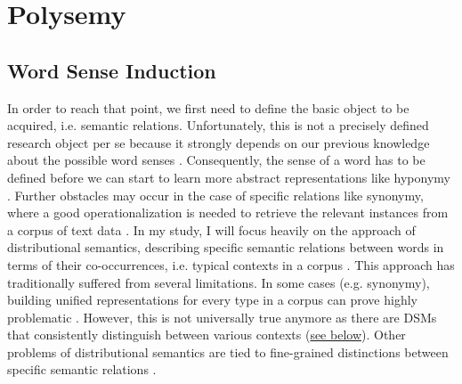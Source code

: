 \chapter{Polysemy}
\section{Word Sense Induction}
\label{polysemyProblemForSemanticRelations}
In order to reach that point, we first need to define the basic object to be acquired, i.e. semantic relations. Unfortunately, this is not a precisely defined research object per se because it strongly depends on our previous knowledge about the possible word senses \parencite[12]{ayseExtractionSemanticWord2011}. Consequently, the sense of a word has to be defined before we can start to learn more abstract representations like hyponymy \parencite[137]{bartunovBreakingSticksAmbiguities2016}. Further obstacles may occur in the case of specific relations like synonymy, where a good operationalization is needed to retrieve the relevant instances from a corpus of text data \parencite[274]{divjakCorpusbasedCognitiveSemantics2009}. In my study, I will focus heavily on the approach of distributional semantics, describing specific semantic relations between words in terms of their co-occurrences, i.e. typical contexts in a corpus \parencites[162]{harrisDistributionalStructure1954}[30]{firthSynopsisLinguisticTheory1957}. This approach has traditionally suffered from several limitations. In some cases (e.g. synonymy), building unified representations for every type in a corpus can prove highly problematic \parencite[114]{karanDistributionalSemanticsApproach2012}. However, this is not universally true anymore as there are \gls{DSM}s that consistently distinguish between various contexts (\hyperlink{ELMO}{see below}). Other problems of distributional semantics are tied to fine-grained distinctions between specific semantic relations \parencite[115]{karanDistributionalSemanticsApproach2012}.

